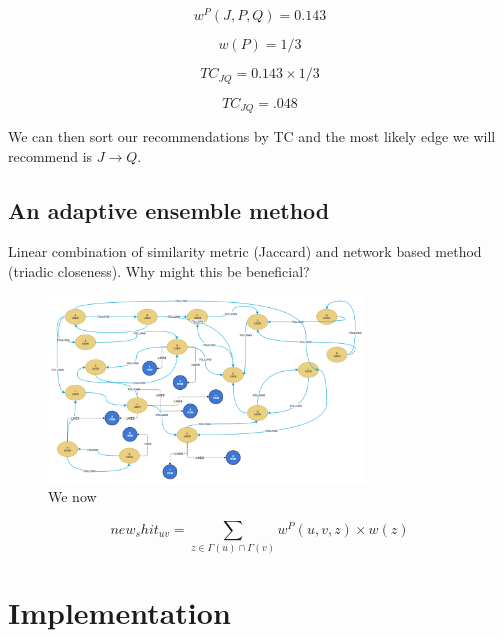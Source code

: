 \begin{equation}
w^{P}(J,P,Q) = 0.143
\end{equation}

\begin{equation}
w(P)=1/3
\end{equation}

\begin{equation}
TC_{JQ} = 0.143 \times 1/3
\end{equation}

\begin{equation}
TC_{JQ} = .048
\end{equation}

We can then sort our recommendations by TC and the most likely edge we will recommend is $J \rightarrow Q$.

\subsection{An adaptive ensemble method}
Linear combination of similarity metric (Jaccard) and network based method (triadic closeness).
Why might this be beneficial?

\begin{figure}[H]
  \centering
  \includegraphics[width=0.75\textwidth]{images/thesis_sample_network_multimodal.png}
  \caption[Adding multi modal edges to sample network]{We now }
  \label{thesis_triad_patterns}
\end{figure}

\begin{equation}
new_shit_{uv} = \sum_{z\in \Gamma(u)\cap \Gamma(v)} w^{P}(u, v, z) \times w(z)  
\end{equation}



\section{Implementation}


